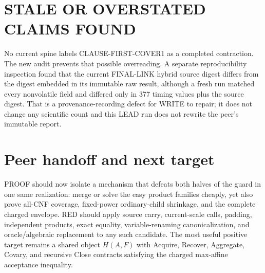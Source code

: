 \documentclass[11pt]{article}
\begin{document}
\section*{STALE OR OVERSTATED CLAIMS FOUND}
No current spine labels CLAUSE-FIRST-COVER1 as a completed contraction.  The
new audit prevents that possible overreading.  A separate reproducibility
inspection found that the current FINAL-LINK hybrid source digest differs from
the digest embedded in its immutable raw result, although a fresh run matched
every nonvolatile field and differed only in 377 timing values plus the source
digest.  That is a provenance-recording defect for WRITE to repair; it does
not change any scientific count and this LEAD run does not rewrite the peer's
immutable report.

\section*{Peer handoff and next target}
PROOF should now isolate a mechanism that defeats both halves of the guard in
one same realization: merge or solve the easy product families cheaply, yet
also prove all-CNF coverage, fixed-power ordinary-child shrinkage, and the
complete charged envelope.  RED should apply source carry, current-scale
calls, padding, independent products, exact equality, variable-renaming
canonicalization, and oracle/algebraic replacement to any such candidate.
The most useful positive target remains a shared object $H(A,F)$ with Acquire,
Recover, Aggregate, Covary, and recursive Close contracts satisfying the
charged max-affine acceptance inequality.



\end{document}
